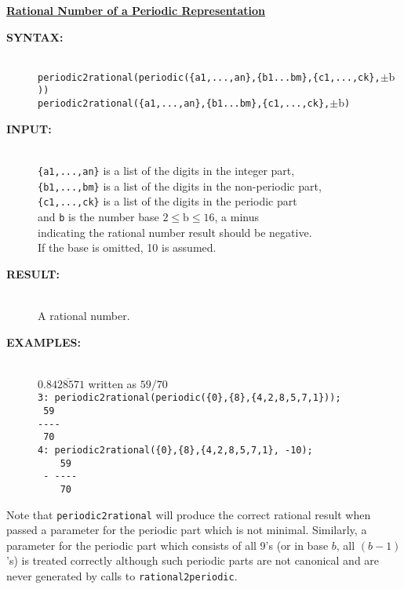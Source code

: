 \textbf{\underline{Rational Number of a Periodic Representation}}\\[\baselineskip]
\begin{description}
\item[\textbf{SYNTAX:}]\mbox{}\\
  \texttt{periodic2rational(periodic(\{a1,...,an\},\{b1...bm\},\{c1,...,ck\},$\pm{\mathrm{b}}$))}\\
  \texttt{periodic2rational(\{a1,...,an\},\{b1...bm\},\{c1,...,ck\},$\pm{\mathrm{b}}$)}

\item[\textbf{INPUT:}]\mbox{}\\
  \texttt{\{a1,...,an\}} is a list of the digits in the integer part,\\
  \texttt{\{b1,...,bm\}} is a list of the digits in the non-periodic part,\\
  \texttt{\{c1,...,ck\}} is a list of the digits in the periodic part\\
  and \texttt{b} is the number base $2 \leq \mathrm{b} \leq 16$, a minus\\
  indicating the rational number result should be negative. \\
  If the base is omitted, 10 is assumed.

\item[\textbf{RESULT:}]\mbox{}\\
  A rational number.

\item[\textbf{EXAMPLES:}]\mbox{}\\[\baselineskip]
  $0.8\overline{428571}$ written as $59/70$ \\
  \texttt{3: periodic2rational(periodic(\{0\},\{8\},\{4,2,8,5,7,1\}));}
  \\[\baselineskip]
  \texttt{\mbox{}~59}\\
  \texttt{-{}-{}-{}-}\\
  \texttt{\mbox{}~70}\\[\baselineskip]
  \texttt{4: periodic2rational(\{0\},\{8\},\{4,2,8,5,7,1\}, -10);}
  \\[\baselineskip]
  \texttt{\mbox{}~~~~59}\\
  \texttt{\mbox{} -\ -{}-{}-{}-}\\
  \texttt{\mbox{}~~~~70}
\end{description}

Note that \texttt{periodic2rational} will produce the correct rational result
when passed a parameter for the periodic part which is not minimal.
Similarly, a parameter for the periodic part which consists of all 9's
(or in base $b$, all $(b-1)$'s) is treated correctly although such periodic
parts are not canonical and are never generated by calls to
\texttt{rational2periodic}.

